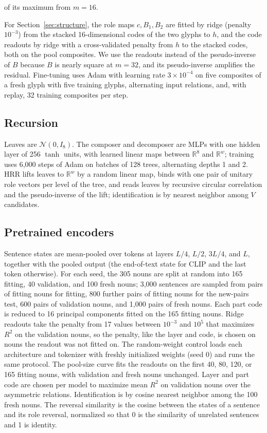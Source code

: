 \documentclass[10pt]{article}
\theoremstyle{plain}
\theoremstyle{remark}
\newcommand{\R}{\mathbb{R}}
\begin{document}
of its maximum from $m = 16$.

For Section~\ref{sec:structure}, the role maps $c, B_1, B_2$ are fitted by ridge (penalty $10^{-3}$) from the stacked 16-dimensional codes of the two glyphs to $h$, and the code readouts by ridge with a cross-validated penalty from $h$ to the stacked codes, both on the pool composites. We use the readouts instead of the pseudo-inverse of $B$ because $B$ is nearly square at $m = 32$, and its pseudo-inverse amplifies the residual. Fine-tuning uses Adam with learning rate $3 \times 10^{-4}$ on five composites of a fresh glyph with five training glyphs, alternating input relations, and, with replay, 32 training composites per step.

\subsection{Recursion}
Leaves are $\mathcal{N}(0, I_8)$. The composer and decomposer are MLPs with one hidden layer of 256 $\tanh$ units, with learned linear maps between $\R^8$ and $\R^w$; training uses 6{,}000 steps of Adam on batches of 128 trees, alternating depths 1 and 2. HRR lifts leaves to $\R^w$ by a random linear map, binds with one pair of unitary role vectors per level of the tree, and reads leaves by recursive circular correlation and the pseudo-inverse of the lift; identification is by nearest neighbor among $V$ candidates.

\subsection{Pretrained encoders}
Sentence states are mean-pooled over tokens at layers $L/4$, $L/2$, $3L/4$, and $L$, together with the pooled output (the end-of-text state for CLIP and the last token otherwise). For each seed, the 305 nouns are split at random into 165 fitting, 40 validation, and 100 fresh nouns; 3{,}000 sentences are sampled from pairs of fitting nouns for fitting, 800 further pairs of fitting nouns for the new-pairs test, 600 pairs of validation nouns, and 1{,}000 pairs of fresh nouns. Each part code is reduced to 16 principal components fitted on the 165 fitting nouns. Ridge readouts take the penalty from 17 values between $10^{-3}$ and $10^{5}$ that maximizes $R^2$ on the validation nouns, so the penalty, like the layer and code, is chosen on nouns the readout was not fitted on. The random-weight control loads each architecture and tokenizer with freshly initialized weights (seed 0) and runs the same protocol. The pool-size curve fits the readouts on the first 40, 80, 120, or 165 fitting nouns, with validation and fresh nouns unchanged. Layer and part code are chosen per model to maximize mean $R^2$ on validation nouns over the asymmetric relations. Identification is by cosine nearest neighbor among the 100 fresh nouns. The reversal similarity is the cosine between the states of a sentence and its role reversal, normalized so that 0 is the similarity of unrelated sentences and 1 is identity.
\end{document}
